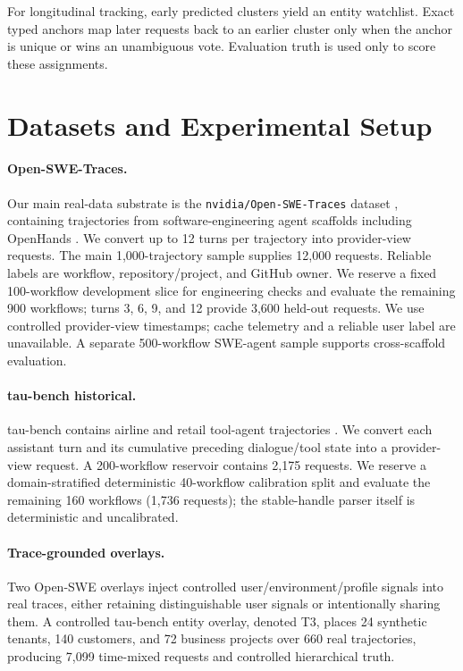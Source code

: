\documentclass[letterpaper]{article}
\begin{document}
For longitudinal tracking, early predicted clusters yield an entity watchlist. Exact typed anchors
map later requests back to an earlier cluster only when the anchor is unique or wins an
unambiguous vote. Evaluation truth is used only to score these assignments.

\section{Datasets and Experimental Setup}

\paragraph{Open-SWE-Traces.}
Our main real-data substrate is the \texttt{nvidia/Open-SWE-Traces} dataset
\cite{nvidiaopenswetraces}, containing trajectories
from software-engineering agent scaffolds including OpenHands
\cite{wang2024openhands}. We convert up to 12 turns per trajectory into provider-view requests.
The main 1,000-trajectory sample supplies 12,000 requests. Reliable labels are workflow,
repository/project, and GitHub owner. We reserve a fixed 100-workflow development slice for
engineering checks and evaluate the remaining 900 workflows; turns 3, 6, 9, and 12 provide 3,600
held-out requests. We use controlled provider-view timestamps; cache telemetry and a reliable user
label are unavailable. A separate 500-workflow SWE-agent sample supports cross-scaffold evaluation.

\paragraph{tau-bench historical.}
tau-bench contains airline and retail tool-agent trajectories
\cite{yao2024taubench}. We convert each assistant turn and its cumulative preceding dialogue/tool
state into a provider-view request. A 200-workflow reservoir contains 2,175 requests. We reserve a
domain-stratified deterministic 40-workflow calibration split and evaluate the remaining 160
workflows (1,736 requests); the stable-handle parser itself is deterministic and uncalibrated.

\paragraph{Trace-grounded overlays.}
Two Open-SWE overlays inject controlled user/environment/profile signals into real traces, either
retaining distinguishable user signals or intentionally sharing them. A controlled tau-bench entity
overlay, denoted T3, places 24 synthetic tenants, 140 customers, and 72 business projects over 660
real trajectories, producing 7,099 time-mixed requests and controlled hierarchical truth.
\end{document}
